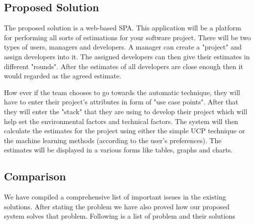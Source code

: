 \subsection{Proposed Solution}
The proposed solution is a web-based SPA. This application will be a platform for performing all sorts of estimations for your software project. There will be two types of users, managers and developers. A manager can create a "project" and assign developers into it. The assigned developers can then give their estimates in different "rounds". After the estimates of all developers are close enough then it would regarded as the agreed estimate.

How ever if the team chooses to go towards the automatic technique, they will have to enter their project's attributes in form of "use case points". After that they will enter the "stack" that they are using to develop their project which will help set the environmental factors and technical factors. The system will then calculate the estimates for the project using either the simple UCP technique or the machine learning methods (according to the user's preferences). The estimates will be displayed in a various forms like tables, graphs and charts.


\subsection{Comparison}
We have compiled a comprehensive list of important issues in the existing solutions. After stating the problem we have also proved how our proposed system solves that problem. Following is a list of problem and their solutions

